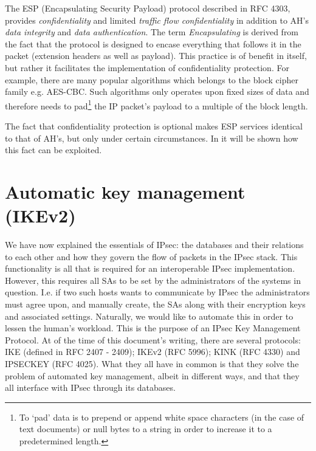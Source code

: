 \documentclass[final,a4paper,twoside,11pt,onecolumn]{report}
\begin{document}
The ESP (Encapsulating Security Payload) protocol described in RFC 4303\cite{rfc4303}, provides \emph{confidentiality} and limited \emph{traffic flow confidentiality} in addition to AH's \emph{data integrity} and \emph{data authentication}. The term \emph{Encapsulating} is derived from the fact that the protocol is designed to encase everything that follows it in the packet (extension headers as well as payload). This practice is of benefit in itself, but rather it facilitates the implementation of confidentiality protection. For example, there are many popular algorithms which belongs to the block cipher family e.g. AES-CBC. Such algorithms only operates upon fixed sizes of data and therefore needs to pad\footnote{To `pad' data is to prepend or append white space characters (in the case of text documents) or null bytes to a string in order to increase it to a predetermined length.} the IP packet's payload to a multiple of the block length.

The fact that confidentiality protection is optional makes ESP services identical to that of AH's, but only under certain circumstances. In  it will be shown how this fact can be exploited.


% 
% 


\section{Automatic key management (IKEv2)}%
We have now explained the essentials of IPsec: the databases and their relations to each other and how they govern the flow of packets in the IPsec stack. This functionality is all that is required for an interoperable IPsec implementation. However, this requires all SAs to be set by the administrators of the systems in question. I.e. if two such hosts wants to communicate by IPsec the administrators must agree upon, and manually create, the SAs along with their encryption keys and associated settings. Naturally, we would like to automate this in order to lessen the human's workload. This is the purpose of an IPsec Key Management Protocol. At of the time of this document's writing, there are several protocols: IKE (defined in RFC 2407 - 2409)\cite{rfc2407}\cite{rfc2408}\cite{rfc2409}; IKEv2 (RFC 5996)\cite{rfc5996}; KINK (RFC 4330)\cite{rfc4330} and IPSECKEY (RFC 4025)\cite{rfc4025}. What they all have in common is that they solve the problem of automated key management, albeit in different ways, and that they all interface with IPsec through its databases.
\end{document}
